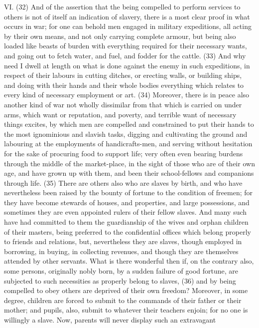 VI. (32) And of the assertion that the being compelled to perform services to others is not of itself
an indication of slavery, there is a most clear proof in what occurs in war; for one can behold men
engaged in military expeditions, all acting by their own means, and not only carrying complete
armour, but being also loaded like beasts of burden with everything required for their necessary
wants, and going out to fetch water, and fuel, and fodder for the cattle. (33) And why need I dwell at
length on what is done against the enemy in such expeditions, in respect of their labours in cutting
ditches, or erecting walls, or building ships, and doing with their hands and their whole bodies
everything which relates to every kind of necessary employment or art. (34) Moreover, there is in
peace also another kind of war not wholly dissimilar from that which is carried on under arms,
which want or reputation, and poverty, and terrible want of necessary things excites, by which men
are compelled and constrained to put their hands to the most ignominious and slavish tasks,
digging and cultivating the ground and labouring at the employments of handicrafts-men, and
serving without hesitation for the sake of procuring food to support life; very often even bearing
burdens through the middle of the market-place, in the sight of those who are of their own age, and
have grown up with them, and been their school-fellows and companions through life. (35) There
are others also who are slaves by birth, and who have nevertheless been raised by the bounty of
fortune to the condition of freemen; for they have become stewards of houses, and properties, and
large possessions, and sometimes they are even appointed rulers of their fellow slaves. And many
such have had committed to them the guardianship of the wives and orphan children of their
masters, being preferred to the confidential offices which belong properly to friends and relations,
but, nevertheless they are slaves, though employed in borrowing, in buying, in collecting revenues,
and though they are themselves attended by other servants. What is there wonderful then if, on the
contrary also, some persons, originally nobly born, by a sudden failure of good fortune, are
subjected to such necessities as properly belong to slaves, (36) and by being compelled to obey
others are deprived of their own freedom? Moreover, in some degree, children are forced to
submit to the commands of their father or their mother; and pupils, also, submit to whatever their
teachers enjoin; for no one is willingly a slave. Now, parents will never display such an extravagant
